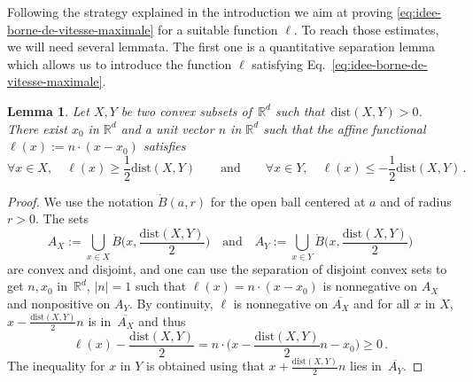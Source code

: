 \documentclass[12pt]{article}
\newcommand{\dXY}{{\mathrm{dist}(X,Y)}}
\theoremstyle{plain}
\newtheorem{lemma}[theo]{Lemma}
\begin{document}
Following the strategy explained in the introduction we aim at proving \eqref{eq:idee-borne-de-vitesse-maximale} for a suitable function $\ell$.
%
To reach those estimates, we will need several lemmata. The first one is a quantitative separation lemma which allows us to introduce the function $\ell$ satisfying Eq.~\eqref{eq:idee-borne-de-vitesse-maximale}.
	\begin{lemma}\label{lm:convex}
		Let $X,Y$ be two convex subsets of~$\mathbb{R}^d$ such that~$\dXY>0$. 
		There exist $x_0$ in $\mathbb{R}^d$ and a unit vector $n$  in $\mathbb{R}^d$ such that the affine functional~$\ell(x):=n\cdot (x-x_0)$ satisfies
		\begin{equation*}
		    \forall x\in X,\quad \ell(x)\ge\frac12 \dXY \qquad \text{and} \qquad \forall x\in Y,\quad \ell(x)\le-\frac12 \dXY\,.
		\end{equation*}
\end{lemma}

	\begin{proof}
		We use the notation $\mathring{B}(a,r)$ for the open ball centered at $a$ and of radius $r>0$.  The sets
		\[A_X:=\bigcup_{x\in {X}} \mathring{B}\Big(x,\frac{\dXY}{2}\Big)\quad \text{and}\quad A_Y:=\bigcup_{x\in {Y}} \mathring{B}\Big(x,\frac{\dXY}{2}\Big)
		\]
		are convex and disjoint, and one can use the separation of disjoint convex sets to get $n,x_0$ in~$\mathbb{R}^d$, $|n|=1$ such that $\ell(x)=n\cdot (x-x_0)$ is nonnegative on $A_X$ and nonpositive on $A_Y$. By continuity, $\ell$ is nonnegative on $\overline{A_X}$ and for all $x$ in $X$, $x-\frac{\dXY}{2}n$ is in~$\overline{A_X}$ and thus\[ \ell(x)-\frac{\dXY}{2}=n\cdot\Big(x-\frac{\dXY}{2}n-x_0\Big)\geq 0\,.\]
		The inequality for $x$ in $Y$ is obtained using that $x+\frac{\dXY}{2}n$ lies in~$\overline{A_Y}$.
	\end{proof}
	
\end{document}
